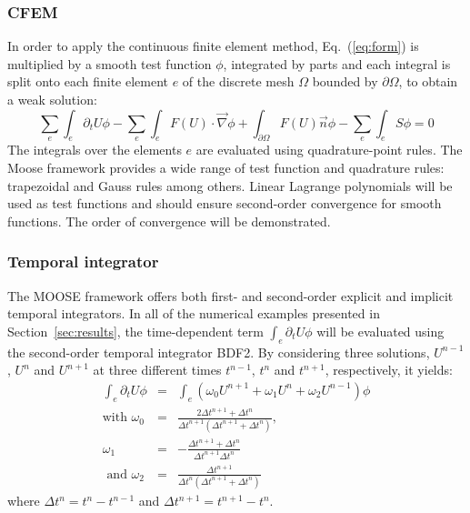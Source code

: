 \documentclass[preprint,10pt]{elsarticle}
\newcommand{\grad}{\vec{\nabla}}
\newcommand{\eqt}[1]{Eq.~(\ref{#1})}                     %
\newcommand{\sct}[1]{Section~\ref{#1}}                   %
\begin{document}
\subsubsection{CFEM} 
In order to apply the continuous finite element method, \eqt{eq:form} is multiplied by a smooth test function $\phi$, integrated by parts and each integral is split onto each finite element $e$ of the discrete mesh $\Omega$ bounded by $\partial \Omega$, to obtain a weak solution:
\begin{equation}
\sum_e \int_{e} \partial_t U \phi - \sum_e \int_{e} F(U) \cdot \grad \phi + \int_{\partial \Omega} F(U) \vec{n} \phi - \sum_e \int_{e} S \phi = 0
\end{equation}
The integrals over the elements $e$ are evaluated using quadrature-point rules. The Moose framework provides a wide range of test function and quadrature rules: trapezoidal and Gauss rules among others. Linear Lagrange polynomials will be used as test functions and should ensure second-order convergence for smooth functions. The order of convergence will be demonstrated.
\subsubsection{Temporal integrator} 
The MOOSE framework offers both first- and second-order explicit and implicit temporal integrators. In all of the numerical examples presented in \sct{sec:results}, the time-dependent term $\int_{e} \partial_t U \phi$ will be evaluated using the second-order temporal integrator BDF2. By considering three solutions, $U^{n-1}$, $U^n$ and $U^{n+1}$ at three different times $t^{n-1}$, $t^n$ and $t^{n+1}$, respectively, it yields:
\begin{eqnarray}
\label{eq:BDF2}
\int_{e} \partial_t U \phi &=& \int_{e} \left( \omega_0 U^{n+1}  + \omega_1 U^n + \omega_2 U^{n-1} \right) \phi\\
\text{with }\omega_0 &=&\frac{2\Delta t^{n+1}+\Delta t^n}{\Delta t^{n+1} \left( \Delta t^{n+1}+\Delta t^n \right)} \text{, } \nonumber \\
\omega_1 &=& -\frac{\Delta t^{n+1}+\Delta t^n}{\Delta t^{n+1} \Delta t^n}\nonumber \\
\text{ and } \omega_2 &=& \frac{\Delta t^{n+1}}{\Delta t^n \left( \Delta t^{n+1} + \Delta t^n \right)} \nonumber
\end{eqnarray}
where $\Delta t^{n} = t^n-t^{n-1}$ and $\Delta t^{n+1} = t^{n+1}-t^{n}$.
\end{document}
